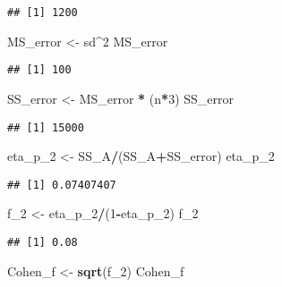 \documentclass[]{article}
\newenvironment{Shaded}{\begin{snugshade}}{\end{snugshade}}
\newcommand{\KeywordTok}[1]{\textcolor[rgb]{0.13,0.29,0.53}{\textbf{#1}}}
\newcommand{\DecValTok}[1]{\textcolor[rgb]{0.00,0.00,0.81}{#1}}
\newcommand{\StringTok}[1]{\textcolor[rgb]{0.31,0.60,0.02}{#1}}
\newcommand{\OperatorTok}[1]{\textcolor[rgb]{0.81,0.36,0.00}{\textbf{#1}}}
\newcommand{\NormalTok}[1]{#1}
\begin{document}
\begin{verbatim}
## [1] 1200
\end{verbatim}

\begin{Shaded}
\begin{Highlighting}[]
\NormalTok{MS_error <-}\StringTok{ }\NormalTok{sd}\OperatorTok{^}\DecValTok{2}
\NormalTok{MS_error}
\end{Highlighting}
\end{Shaded}

\begin{verbatim}
## [1] 100
\end{verbatim}

\begin{Shaded}
\begin{Highlighting}[]
\NormalTok{SS_error <-}\StringTok{ }\NormalTok{MS_error }\OperatorTok{*}\StringTok{ }\NormalTok{(n}\OperatorTok{*}\DecValTok{3}\NormalTok{) }
\NormalTok{SS_error}
\end{Highlighting}
\end{Shaded}

\begin{verbatim}
## [1] 15000
\end{verbatim}

\begin{Shaded}
\begin{Highlighting}[]
\NormalTok{eta_p_}\DecValTok{2}\NormalTok{ <-}\StringTok{ }\NormalTok{SS_A}\OperatorTok{/}\NormalTok{(SS_A}\OperatorTok{+}\NormalTok{SS_error)}
\NormalTok{eta_p_}\DecValTok{2}
\end{Highlighting}
\end{Shaded}

\begin{verbatim}
## [1] 0.07407407
\end{verbatim}

\begin{Shaded}
\begin{Highlighting}[]
\NormalTok{f_}\DecValTok{2}\NormalTok{ <-}\StringTok{ }\NormalTok{eta_p_}\DecValTok{2}\OperatorTok{/}\NormalTok{(}\DecValTok{1}\OperatorTok{-}\NormalTok{eta_p_}\DecValTok{2}\NormalTok{)}
\NormalTok{f_}\DecValTok{2}
\end{Highlighting}
\end{Shaded}

\begin{verbatim}
## [1] 0.08
\end{verbatim}

\begin{Shaded}
\begin{Highlighting}[]
\NormalTok{Cohen_f <-}\StringTok{ }\KeywordTok{sqrt}\NormalTok{(f_}\DecValTok{2}\NormalTok{)}
\NormalTok{Cohen_f}
\end{Highlighting}
\end{Shaded}
\end{document}
